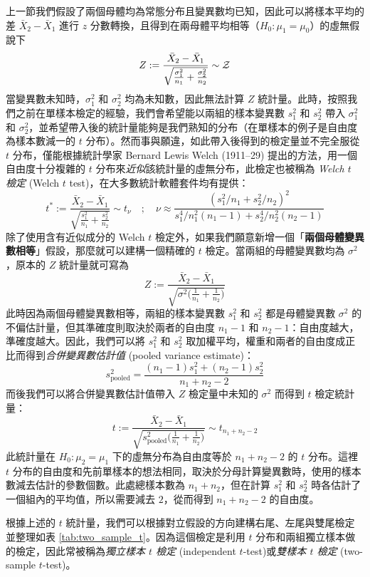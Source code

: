     上一節我們假設了兩個母體均為常態分布且變異數均已知，因此可以將樣本平均的差 $\bar{X}_2-\bar{X}_1$ 進行 $z$ 分數轉換，且得到在兩母體平均相等（$H_0: \mu_1 = \mu_0$）的虛無假說下
    \smallskip
    \[Z := \frac{\bar{X}_2-\bar{X}_1}{\sqrt{\frac{\sigma_1^2}{n_1} + \frac{\sigma_2^2}{n_2}}} \sim \mathcal{Z}\]
    \smallskip
    當變異數未知時，$\sigma_1^2$ 和 $\sigma_2^2$ 均為未知數，因此無法計算 $Z$ 統計量。此時，按照我們之前在單樣本檢定的經驗，我們會希望能以兩組的樣本變異數 $s_1^2$ 和 $s_2^2$ 帶入 $\sigma_1^2$ 和 $\sigma_2^2$，並希望帶入後的統計量能夠是我們熟知的分布（在單樣本的例子是自由度為樣本數減一的 $t$ 分布）。然而事與願違，如此帶入後得到的檢定量並不完全服從 $t$ 分布，僅能根據統計學家 Bernard Lewis Welch (1911–29) 提出的方法，用一個自由度十分複雜的 $t$ 分布來\textit{近似}該統計量的虛無分布，此檢定也被稱為 \textit{Welch $t$ 檢定} (Welch $t$ test)，在大多數統計軟體套件均有提供：
    \smallskip
    \[t^* := \frac{\bar{X}_2-\bar{X}_1}{\sqrt{\frac{s_1^2}{n_1} + \frac{s_2^2}{n_2}}} \sim t_\nu \quad; \quad \nu \approx \frac{(s_1^2/n_1+s_2^2/n_2)^2}{s_1^4/n_1^2(n_1-1) +s_2^4/n_2^2(n_2-1)}\]
    \smallskip
    除了使用含有近似成分的 Welch $t$ 檢定外，如果我們願意新增一個「\textbf{兩個母體變異數相等}」假設，那麼就可以建構一個精確的 $t$ 檢定。當兩組的母體變異數均為 $\sigma^2$，原本的 $Z$ 統計量就可寫為
    \smallskip
    \[Z := \frac{\bar{X}_2-\bar{X}_1}{\sqrt{\sigma^2\big(\frac{1}{n_1} + \frac{1}{n_2}\big)}}\]
    \smallskip
    此時因為兩個母體變異數相等，兩組的樣本變異數 $s_1^2$ 和 $s_2^2$ 都是母體變異數 $\sigma^2$ 的不偏估計量，但其準確度則取決於兩者的自由度 $n_1-1$ 和 $n_2-1$：自由度越大，準確度越大。因此，我們可以將 $s_1^2$ 和 $s_2^2$ 取加權平均，權重和兩者的自由度成正比而得到\textit{合併變異數估計值} (pooled variance estimate)：
    \smallskip
    \[s_{\text{pooled}}^2 = \frac{(n_1-1)s_1^2 + (n_2-1)s_2^2}{n_1+n_2-2}\]
    \smallskip
    而後我們可以將合併變異數估計值帶入 $Z$ 檢定量中未知的 $\sigma^2$ 而得到 $t$ 檢定統計量：
    \smallskip
    \[ t := \frac{\bar{X}_2-\bar{X}_1}{\sqrt{s_{\text{pooled}}^2\big(\frac{1}{n_1} + \frac{1}{n_2}\big)}} \sim t_{n_1+n_2-2}\]
    \smallskip
    此統計量在 $H_0: \mu_2 = \mu_1$ 下的虛無分布為自由度等於 $n_1 + n_2 - 2$ 的 $t$ 分布。這裡 $t$ 分布的自由度和先前單樣本的想法相同，取決於分母計算變異數時，使用的樣本數減去估計的參數個數。此處總樣本數為 $n_1+n_2$，但在計算 $s_1^2$ 和 $s_2^2$ 時各估計了一個組內的平均值，所以需要減去 $2$，從而得到 $n_1 + n_2 - 2$ 的自由度。

    \medskip
    
    根據上述的 $t$ 統計量，我們可以根據對立假設的方向建構右尾、左尾與雙尾檢定並整理如表 \ref{tab:two_sample_t}。因為這個檢定是利用 $t$ 分布和兩組獨立樣本做的檢定，因此常被稱為\textit{獨立樣本 $t$ 檢定} (independent $t$-test)或\textit{雙樣本 $t$ 檢定} (two-sample $t$-test)。

